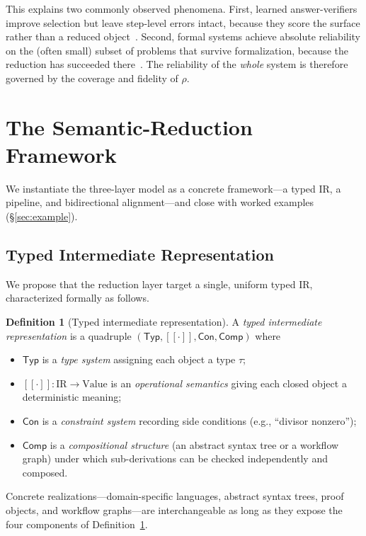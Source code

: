 \documentclass[11pt]{article}
\newcommand{\den}[1]{[\![#1]\!]}
\theoremstyle{definition}
\newtheorem{definition}{Definition}[section]
\theoremstyle{plain}
\theoremstyle{remark}
\begin{document}
This explains two commonly observed phenomena. First, learned answer-verifiers improve
selection but leave step-level errors intact, because they score the surface rather than a
reduced object~\cite{cobbe2021,lightman2024}. Second, formal systems achieve absolute
reliability on the (often small) subset of problems that survive formalization, because the
reduction has succeeded there~\cite{hubert2025}. The reliability of the \emph{whole} system is
therefore governed by the coverage and fidelity of $\rho$.

\section{The Semantic-Reduction Framework}\label{sec:framework}
We instantiate the three-layer model as a concrete framework---a typed IR, a pipeline,
and bidirectional alignment---and close with worked examples (\S\ref{sec:example}).

\subsection{Typed Intermediate Representation}
We propose that the reduction layer target a single, uniform typed IR, characterized
formally as follows.

\begin{definition}[Typed intermediate representation]\label{def:ir}
A \emph{typed intermediate representation} is a quadruple
$(\mathsf{Typ}, \den{\cdot}, \mathsf{Con}, \mathsf{Comp})$ where
\begin{itemize}[leftmargin=1.5em]
  \item $\mathsf{Typ}$ is a \emph{type system} assigning each object a type $\tau$;
  \item $\den{\cdot} : \mathrm{IR} \to \mathrm{Value}$ is an \emph{operational semantics}
        giving each closed object a deterministic meaning;
  \item $\mathsf{Con}$ is a \emph{constraint system} recording side conditions
        (e.g., ``divisor nonzero'');
  \item $\mathsf{Comp}$ is a \emph{compositional structure} (an abstract syntax tree or a
        workflow graph) under which sub-derivations can be checked independently and composed.
\end{itemize}
\end{definition}

Concrete realizations---domain-specific languages, abstract syntax trees, proof objects, and
workflow graphs---are interchangeable as long as they expose the four components of
Definition~\ref{def:ir}.
\end{document}
